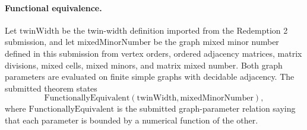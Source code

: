 \paragraph{Functional equivalence.}
Let \(\mathrm{twinWidth}\) be the twin-width definition imported from the
Redemption 2 submission, and let \(\mathrm{mixedMinorNumber}\) be the graph
mixed minor number defined in this submission from vertex orders, ordered
adjacency matrices, matrix divisions, mixed cells, mixed minors, and matrix
mixed number.  Both graph parameters are evaluated on finite simple graphs
with decidable adjacency.  The submitted theorem states
\[
  \mathrm{FunctionallyEquivalent}(\mathrm{twinWidth},\mathrm{mixedMinorNumber}),
\]
where \(\mathrm{FunctionallyEquivalent}\) is the submitted graph-parameter
relation saying that each parameter is bounded by a numerical function of the
other.
